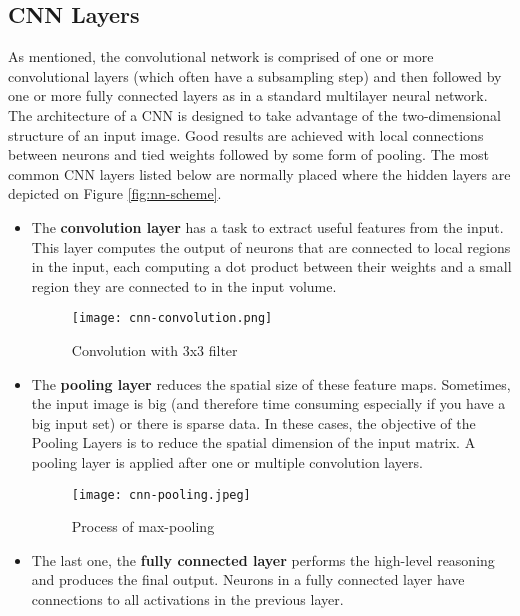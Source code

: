 \documentclass[../Main.tex]{subfiles}
\begin{document}
    \subsection{CNN Layers}
    As mentioned, the convolutional network is comprised of one or more convolutional layers (which often have a subsampling step) and then followed by one or more fully connected layers as in a standard multilayer neural network. The architecture of a CNN is designed to take advantage of the two-dimensional structure of an input image. Good results are achieved with local connections between neurons and tied weights followed by some form of pooling.  The most common CNN layers listed below are normally placed where the hidden layers are depicted on Figure \ref{fig:nn-scheme}. 
    \begin{itemize}
        \item The \textbf{convolution layer} has a task to extract useful features from the input. This layer computes the output of neurons that are connected to local regions in the input, each computing a dot product between their weights and a small region they are connected to in the input volume.  \\
    \begin{figure}[h!]
        \centering
        \texttt{[image: cnn-convolution.png]}
        \caption{Convolution with 3x3 filter}
        \label{fig:cnn-convolution}
    \end{figure}
    
        \item The \textbf{pooling layer} reduces the spatial size of these feature maps. Sometimes, the input image is big (and therefore time consuming especially if you have a big input set) or there is sparse data. In these cases, the objective of the Pooling Layers is to reduce the spatial dimension of the input matrix. A pooling layer is applied after one or multiple convolution layers.\\
    \begin{figure}[h!]
        \centering
        \texttt{[image: cnn-pooling.jpeg]}
        \caption{Process of max-pooling}
        \label{fig:cnn-pooling}
    \end{figure}
    
        \item The last one, the \textbf{fully connected layer} performs the high-level reasoning and produces the final output. Neurons in a fully connected layer have connections to all activations in the previous layer.
    \end{itemize}
    
\end{document}
